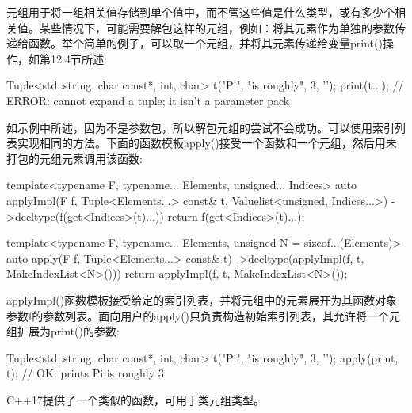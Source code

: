 元组用于将一组相关值存储到单个值中，而不管这些值是什么类型，或有多少个相关值。某些情况下，可能需要解包这样的元组，例如：将其元素作为单独的参数传递给函数。举个简单的例子，可以取一个元组，并将其元素传递给变量print()操作，如第12.4节所述:

\begin{cpp}
Tuple<std::string, char const*, int, char> t("Pi", "is roughly",
3, ’\n’);
print(t...); // ERROR: cannot expand a tuple; it isn’t a parameter pack
\end{cpp}

如示例中所述，因为不是参数包，所以解包元组的尝试不会成功。可以使用索引列表实现相同的方法。下面的函数模板apply()接受一个函数和一个元组，然后用未打包的元组元素调用该函数:

\begin{cpp}
template<typename F, typename... Elements, unsigned... Indices>
auto applyImpl(F f, Tuple<Elements...> const& t,
					Valuelist<unsigned, Indices...>)
	->decltype(f(get<Indices>(t)...))
{
	return f(get<Indices>(t)...);
}

template<typename F, typename... Elements,
		unsigned N = sizeof...(Elements)>
auto apply(F f, Tuple<Elements...> const& t)
	->decltype(applyImpl(f, t, MakeIndexList<N>()))
{
	return applyImpl(f, t, MakeIndexList<N>());
}
\end{cpp}

applyImpl()函数模板接受给定的索引列表，并将元组中的元素展开为其函数对象参数f的参数列表。面向用户的apply()只负责构造初始索引列表，其允许将一个元组扩展为print()的参数:

\begin{cpp}
Tuple<std::string, char const*, int, char> t("Pi", "is roughly",
												3, ’\n’);
apply(print, t); // OK: prints Pi is roughly 3
\end{cpp}

C++17提供了一个类似的函数，可用于类元组类型。






































